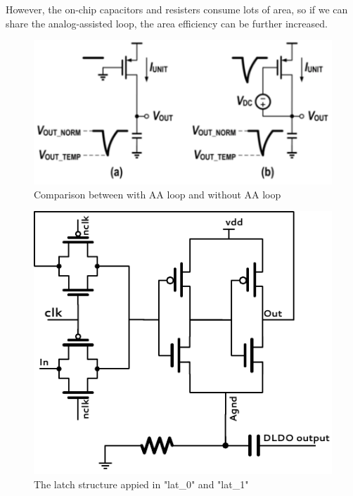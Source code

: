 \documentclass[draftcls, journal]{IEEEtran}
\begin{document}
However, the on-chip capacitors and resisters consume lots of area, so if we can share the analog-assisted loop, the area efficiency can be further increased.
\begin{figure}[t!]
    \centering
    \includegraphics[width=\linewidth]{pic/struc/aaloop.pdf}
    \caption{Comparison between with AA loop and without AA loop}
    \label{fig:aaloop}
\end{figure}
\begin{figure}[t!]
    \centering
    \includegraphics[width=0.9\linewidth]{pic/struc/latch.pdf}
    \caption{The latch structure appied in "lat\_0" and "lat\_1"}
    \label{fig:latch}
\end{figure}




\end{document}
